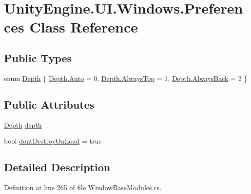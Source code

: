 \hypertarget{class_unity_engine_1_1_u_i_1_1_windows_1_1_preferences}{}\section{Unity\+Engine.\+U\+I.\+Windows.\+Preferences Class Reference}
\label{class_unity_engine_1_1_u_i_1_1_windows_1_1_preferences}
\subsection*{Public Types}
\begin{DoxyCompactItemize}
\item 
enum \hyperlink{class_unity_engine_1_1_u_i_1_1_windows_1_1_preferences_a0b7ae347ecd4997e0c19d20d535d61a3}{Depth} \{ \hyperlink{class_unity_engine_1_1_u_i_1_1_windows_1_1_preferences_a0b7ae347ecd4997e0c19d20d535d61a3a06b9281e396db002010bde1de57262eb}{Depth.\+Auto} = 0, 
\hyperlink{class_unity_engine_1_1_u_i_1_1_windows_1_1_preferences_a0b7ae347ecd4997e0c19d20d535d61a3ab8625463b04870403a51353af57842a6}{Depth.\+Always\+Top} = 1, 
\hyperlink{class_unity_engine_1_1_u_i_1_1_windows_1_1_preferences_a0b7ae347ecd4997e0c19d20d535d61a3a11ae7c8710ac5b0ca029e47421682e1b}{Depth.\+Always\+Back} = 2
 \}
\end{DoxyCompactItemize}
\subsection*{Public Attributes}
\begin{DoxyCompactItemize}
\item 
\hyperlink{class_unity_engine_1_1_u_i_1_1_windows_1_1_preferences_a0b7ae347ecd4997e0c19d20d535d61a3}{Depth} \hyperlink{class_unity_engine_1_1_u_i_1_1_windows_1_1_preferences_a83c733583d69da70ba6880aaf32a07de}{depth}
\item 
bool \hyperlink{class_unity_engine_1_1_u_i_1_1_windows_1_1_preferences_ab726c2b284de2083367736ed13b1a135}{dont\+Destroy\+On\+Load} = true
\end{DoxyCompactItemize}


\subsection{Detailed Description}


Definition at line 265 of file Window\+Base\+Modules.\+cs.




